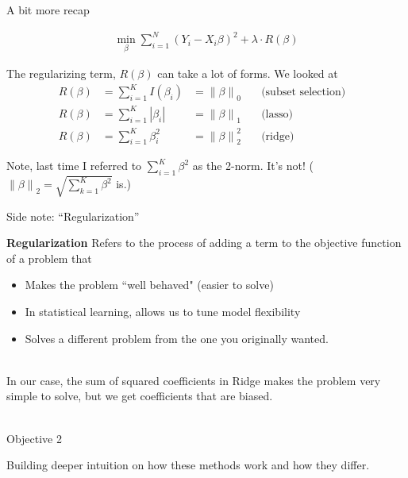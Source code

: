 \documentclass[mathserif, aspectratio=169]{beamer}
\newcommand{\norm}[1]{\left\lVert #1 \right\rVert}
\begin{document}
\begin{frame}{A bit more recap}

\begin{align*}
\min_\beta \sum_{i=1}^N \left(Y_i - X_i \beta \right)^2+\lambda \cdot R(\beta)\end{align*}

The regularizing term, $R(\beta)$ can take a lot of forms.  We looked at
\begin{align*}
R(\beta) & =\sum_{i=1}^K I(\beta_i) &= \norm{\beta}_0 & \quad \text{(subset selection)} &\\
R(\beta) & =\sum_{i=1}^K |\beta_i| & = \norm{\beta}_1 & \quad \text{(lasso)} &\\
R(\beta) & =\sum_{i=1}^K \beta_i^2 & = \norm{\beta}_2^2 & \quad \text{(ridge)} &
\end{align*}

Note, last time I referred to $\sum_{i=1}^K \beta^2$ as the 2-norm.  It's not!  ($\norm{\beta}_2 = \sqrt{\sum_{k=1}^K \beta^2}$ is.)

\end{frame}


\begin{frame}{Side note:  ``Regularization''}

\textbf{Regularization} Refers to the process of adding a term to the objective function of a problem that 
\begin{itemize}
\item Makes the problem ``well behaved" (easier to solve)
\item In statistical learning, allows us to tune model flexibility
\item Solves a different problem from the one you originally wanted.\\~\\
\end{itemize}

In our case, the sum of squared coefficients in Ridge makes the problem very simple to solve, but we get coefficients that are biased.\\~\\


\end{frame}


\begin{frame}{Objective 2}


Building deeper intuition on how these methods work and how they differ.  
\end{frame}
\end{document}
